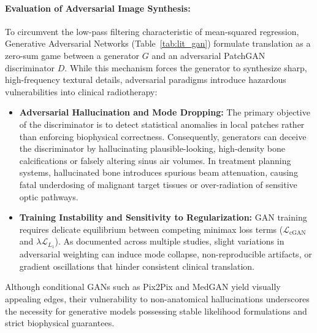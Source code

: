 \paragraph{Evaluation of Adversarial Image Synthesis:}
To circumvent the low-pass filtering characteristic of mean-squared regression, Generative Adversarial Networks (Table~\ref{tab:lit_gan}) formulate translation as a zero-sum game between a generator $G$ and an adversarial PatchGAN discriminator $D$. While this mechanism forces the generator to synthesize sharp, high-frequency textural details, adversarial paradigms introduce hazardous vulnerabilities into clinical radiotherapy:
\begin{itemize}
    \item \textbf{Adversarial Hallucination and Mode Dropping:} The primary objective of the discriminator is to detect statistical anomalies in local patches rather than enforcing biophysical correctness. Consequently, generators can deceive the discriminator by hallucinating plausible-looking, high-density bone calcifications or falsely altering sinus air volumes. In treatment planning systems, hallucinated bone introduces spurious beam attenuation, causing fatal underdosing of malignant target tissues or over-radiation of sensitive optic pathways.
    \item \textbf{Training Instability and Sensitivity to Regularization:} GAN training requires delicate equilibrium between competing minimax loss terms ($\mathcal{L}_{\text{cGAN}}$ and $\lambda \mathcal{L}_{L_1}$). As documented across multiple studies, slight variations in adversarial weighting can induce mode collapse, non-reproducible artifacts, or gradient oscillations that hinder consistent clinical translation.
\end{itemize}
Although conditional GANs such as Pix2Pix and MedGAN yield visually appealing edges, their vulnerability to non-anatomical hallucinations underscores the necessity for generative models possessing stable likelihood formulations and strict biophysical guarantees.

\vspace{10pt}
